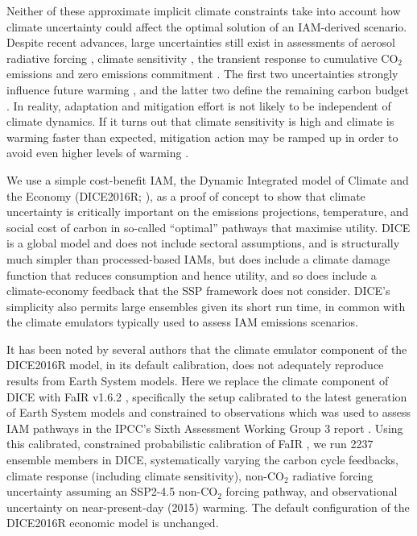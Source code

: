 \documentclass{article}
\begin{document}
Neither of these approximate implicit climate constraints take into account how climate uncertainty could affect the optimal solution of an IAM-derived scenario. Despite recent advances, large uncertainties still exist in assessments of aerosol radiative forcing \citep{Bellouin2020}, climate sensitivity \citep{Sherwood2020}, the transient response to cumulative CO$_2$ emissions \citep{Canadell2021} and zero emissions commitment \citep{Lee2021}. The first two uncertainties strongly influence future warming \citep{Smith2019}, and the latter two define the remaining carbon budget \citep{Rogelj2019}. In reality, adaptation and mitigation effort is not likely to be independent of climate dynamics. If it turns out that climate sensitivity is high and climate is warming faster than expected, mitigation action may be ramped up in order to avoid even higher levels of warming \citep{Folini2022}.

We use a simple cost-benefit IAM, the Dynamic Integrated model of Climate and the Economy (DICE2016R; \citet{Nordhaus2017,Nordhaus2018}), as a proof of concept to show that climate uncertainty is critically important on the emissions projections, temperature, and social cost of carbon in so-called ``optimal'' pathways that maximise utility. DICE is a global model and does not include sectoral assumptions, and is structurally much simpler than processed-based IAMs, but does include a climate damage function that reduces consumption and hence utility, and so does include a climate-economy feedback that the SSP framework does not consider. DICE's simplicity also permits large ensembles given its short run time, in common with the climate emulators typically used to assess IAM emissions scenarios.

It has been noted by several authors \citep{Folini2022,Dietz2021,Gasser2021} that the climate emulator component of the DICE2016R model, in its default calibration, does not adequately reproduce results from Earth System models. Here we replace the climate component of DICE with FaIR v1.6.2 \citep{Millar2017,Smith2018,Leach2021}, specifically the setup calibrated to the latest generation of Earth System models and constrained to observations which was used to assess IAM pathways in the IPCC's Sixth Assessment Working Group 3 report \citep{Riahi2022,Kikstra2022,Byers2022,IPCC2022WG3}. Using this calibrated, constrained probabilistic calibration of FaIR \citep{Smith2021}, we run 2237 ensemble members in DICE, systematically varying the carbon cycle feedbacks, climate response (including climate sensitivity), non-CO$_2$ radiative forcing uncertainty assuming an SSP2-4.5 non-CO$_2$ forcing pathway, and observational uncertainty on near-present-day (2015) warming. The default configuration of the DICE2016R economic model is unchanged.
\end{document}
